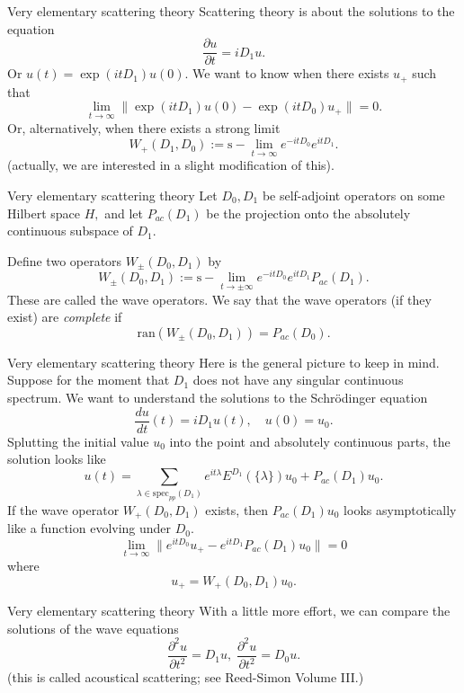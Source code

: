 \documentclass{beamer}
\numberwithin{equation}{section}
\theoremstyle{plain}
\theoremstyle{plain}
\theoremstyle{definition}
\theoremstyle{plain}
\theoremstyle{plain}
\theoremstyle{definition}
\begin{document}
\begin{frame}{Very elementary scattering theory}
  Scattering theory is about the solutions to the equation
  \[
    \frac{\partial u}{\partial t} = iD_1u.
  \]
  Or $u(t) = \exp(itD_1)u(0).$ We want to know when
  there exists $u_+$ such that
  \[
      \lim_{t\to\infty} \|\exp(itD_1)u(0)-\exp(itD_0)u_+\| = 0.
  \]
  Or, alternatively, when there exists a strong limit
  \[
    W_+(D_1,D_0) := {\mathrm{s}-}\lim_{t\to\infty} e^{-itD_0}e^{itD_1}.
  \]
  (actually, we are interested in a slight modification of this).
\end{frame}


\begin{frame}{Very elementary scattering theory}
  Let $D_0,D_1$ be self-adjoint operators on some Hilbert space $H,$ and let $P_{ac}(D_1)$ be the projection onto the absolutely continuous subspace of $D_1.$

  Define two operators $W_{\pm}(D_0,D_1)$ by
  \[
    W_{\pm}(D_0,D_1) := {\mathrm{s}-}\lim_{t\to\pm \infty} e^{-itD_0}e^{itD_1}P_{ac}(D_1).
  \]
  These are called the wave operators. We say that the wave operators (if they exist) are \emph{complete}
  if
  \[
      \mathrm{ran}(W_{\pm}(D_0,D_1)) = P_{ac}(D_0).
  \]
\end{frame}

\begin{frame}{Very elementary scattering theory}
  Here is the general picture to keep in mind. Suppose for the moment that $D_1$ does not have any singular continuous spectrum. We want to understand the solutions to the Schr\"odinger equation
  \[
    \frac{du}{dt}(t) = iD_1u(t),\quad u(0) = u_0.
  \]
  Splutting the initial value $u_0$ into the point and absolutely continuous parts, the solution looks like
  \[
    u(t) = \sum_{\lambda \in \mathrm{spec}_{pp}(D_1)} e^{it\lambda}E^{D_1}(\{\lambda\})u_0 + P_{ac}(D_1)u_0.
  \]
  If the wave operator $W_{+}(D_0,D_1)$ exists, then $P_{ac}(D_1)u_0$ looks asymptotically like a function evolving under $D_0.$
  \[
      \lim_{t\to\infty} \|e^{itD_0}u_+ - e^{itD_1}P_{ac}(D_1)u_0\| = 0
  \]
  where
  \[
      u_+ =W_+(D_0,D_1)u_0.
  \]
\end{frame}


\begin{frame}{Very elementary scattering theory}
  With a little more effort, we can compare the solutions of the wave equations
  \[
    \frac{\partial^2 u}{\partial t^2} = D_1u,\; \frac{\partial^2 u}{\partial t^2} = D_0u.
  \]
  (this is called acoustical scattering; see Reed-Simon Volume III.)
\end{frame}
\end{document}
